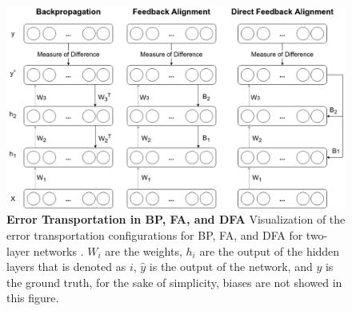 \documentclass[a4paper, nobind]{templates/ociamthesis}
\begin{document}
\begin{figure}

{\centering \includegraphics[width=1\linewidth]{figures/1_ErrorPropagation} 

}

\caption[Error Transportation in BP, FA, and DFA]{\textbf{Error Transportation in BP, FA, and DFA} \newline Visualization of the error transportation configurations for BP, FA, and DFA for two-layer networks \cite{nøkland2016direct}. $W_i$ are the weights, $h_i$ are the output of the hidden layers that is denoted as $i$, $\hat{y}$ is the output of the network, and $y$ is the ground truth, for the sake of simplicity, biases are not showed in this figure.}\label{fig:Error-Propagation}
\end{figure}
\end{document}
